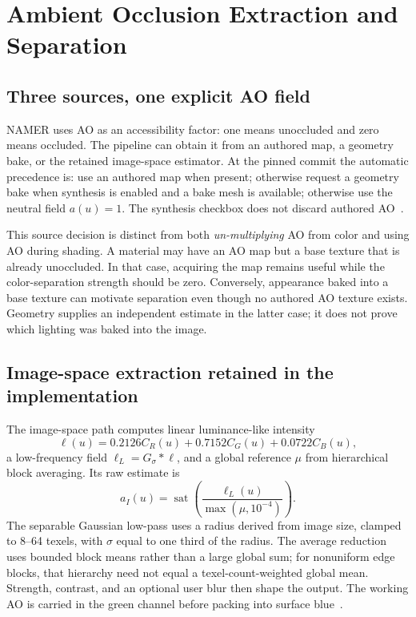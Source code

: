 \documentclass[11pt,letterpaper]{article}
\newcommand{\sat}{\operatorname{sat}}
\begin{document}
\FloatBarrier
\section{Ambient Occlusion Extraction and Separation}
\label{sec:ao}
\subsection{Three sources, one explicit AO field}
NAMER uses AO as an accessibility factor: one means unoccluded and zero means occluded. The pipeline can obtain it from an authored map, a geometry bake, or the retained image-space estimator. At the pinned commit the automatic precedence is: use an authored map when present; otherwise request a geometry bake when synthesis is enabled and a bake mesh is available; otherwise use the neutral field $a(u)=1$. The synthesis checkbox does not discard authored AO~\cite{namer2026}.

This source decision is distinct from both \emph{un-multiplying} AO from color and using AO during shading. A material may have an AO map but a base texture that is already unoccluded. In that case, acquiring the map remains useful while the color-separation strength should be zero. Conversely, appearance baked into a base texture can motivate separation even though no authored AO texture exists. Geometry supplies an independent estimate in the latter case; it does not prove which lighting was baked into the image.

\subsection{Image-space extraction retained in the implementation}
The image-space path computes linear luminance-like intensity
\begin{equation}
\ell(u)=0.2126C_R(u)+0.7152C_G(u)+0.0722C_B(u),
\end{equation}
a low-frequency field $\ell_L=G_\sigma*\ell$, and a global reference $\mu$ from hierarchical block averaging. Its raw estimate is
\begin{equation}
a_I(u)=\sat\!\left(\frac{\ell_L(u)}{\max(\mu,10^{-4})}\right).
\label{eq:imageao}
\end{equation}
The separable Gaussian low-pass uses a radius derived from image size, clamped to 8--64 texels, with $\sigma$ equal to one third of the radius. The average reduction uses bounded block means rather than a large global sum; for nonuniform edge blocks, that hierarchy need not equal a texel-count-weighted global mean. Strength, contrast, and an optional user blur then shape the output. The working AO is carried in the green channel before packing into surface blue~\cite{namer2026}.
\end{document}
